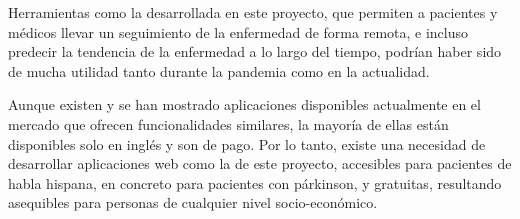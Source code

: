 Herramientas como la desarrollada en este proyecto, que permiten a pacientes y médicos llevar un seguimiento de la enfermedad de forma remota, e incluso predecir la tendencia de la enfermedad a lo largo del tiempo, podrían haber sido de mucha utilidad tanto durante la pandemia como en la actualidad.

Aunque existen y se han mostrado aplicaciones disponibles actualmente en el mercado que ofrecen funcionalidades similares, la mayoría de ellas están disponibles solo en inglés y son de pago. Por lo tanto, existe una necesidad de desarrollar aplicaciones web como la de este proyecto, accesibles para pacientes de habla hispana, en concreto para pacientes con párkinson, y gratuitas, resultando asequibles para personas de cualquier nivel socio-económico. 